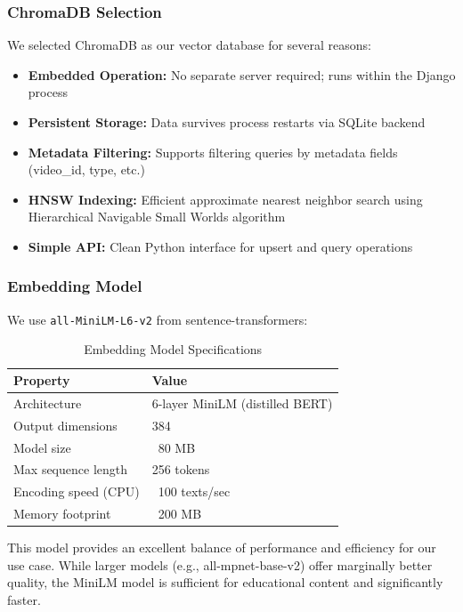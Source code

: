 \documentclass[12pt,a4paper]{article}
\begin{document}
\subsubsection{ChromaDB Selection}

We selected ChromaDB as our vector database for several reasons:

\begin{itemize}
    \item \textbf{Embedded Operation:} No separate server required; runs within the Django process
    \item \textbf{Persistent Storage:} Data survives process restarts via SQLite backend
    \item \textbf{Metadata Filtering:} Supports filtering queries by metadata fields (video\_id, type, etc.)
    \item \textbf{HNSW Indexing:} Efficient approximate nearest neighbor search using Hierarchical Navigable Small Worlds algorithm
    \item \textbf{Simple API:} Clean Python interface for upsert and query operations
\end{itemize}

\subsubsection{Embedding Model}

We use \texttt{all-MiniLM-L6-v2} from sentence-transformers:

\begin{table}[H]
    \centering
    \caption{Embedding Model Specifications}
    \begin{tabular}{@{}ll@{}}
        \toprule
        \textbf{Property} & \textbf{Value} \\ \midrule
        Architecture & 6-layer MiniLM (distilled BERT) \\
        Output dimensions & 384 \\
        Model size & ~80 MB \\
        Max sequence length & 256 tokens \\
        Encoding speed (CPU) & ~100 texts/sec \\
        Memory footprint & ~200 MB \\ \bottomrule
    \end{tabular}
\end{table}

This model provides an excellent balance of performance and efficiency for our use case. While larger models (e.g., all-mpnet-base-v2) offer marginally better quality, the MiniLM model is sufficient for educational content and significantly faster.
\end{document}

